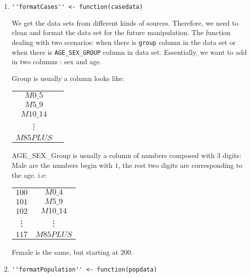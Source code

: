 \documentclass{article}
\begin{document}
\begin{enumerate}
\item 

\begin{verbatim}
''formatCases'' <- function(casedata)
\end{verbatim}



We get the data sets from different kinds of sources. Therefore, we need to clean and format the data set
for the future manipulation. The function dealing with two scenarios: when there is  \texttt{group} column in the data set
or when there is  \small \texttt{AGE\_SEX\_GROUP} column in data set. Essentially, we want to add in two
columns : sex and age.
\large

Group is usually a column looks like:
\begin{table}[ht]
\begin{center}
\begin{tabular}{|c|c|}
\hline
 $M0\_5$ \\
 $M5\_9$ \\
 $M10\_14$ \\
  \vdots  \\
 $M85PLUS$ \\
\hline
\end{tabular}
\end{center}
\end{table}


AGE\_SEX\_Group is usually a column of numbers composed with $3$ digits:
Male are the numbers begin with $1$, the rest two digits are corresponding to the age.
i.e:

\begin{table}[ht]
\begin{center}
\begin{tabular}{|c|c|}
\hline
$100$  &  $M0\_4$ \\
$101$  &  $M5\_9$ \\
$102$  &  $M10\_14$ \\
\vdots  &  \vdots  \\
$117$  &  $M85PLUS$ \\
\hline
\end{tabular}
\end{center}
\end{table}

Female is the same, but starting at $200$.


\item
\begin{verbatim}
''formatPopulation'' <- function(popdata)
\end{verbatim}


\end{enumerate}
\end{document}
